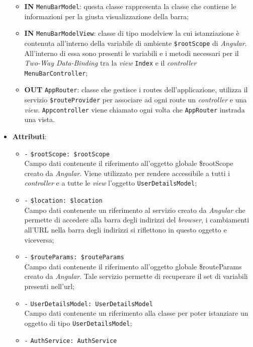 \begin{itemize}
\begin{itemize}
		\item \textbf{IN} \texttt{MenuBarModel}: questa classe rappresenta la classe che contiene le informazioni per la giusta visualizzazione della barra;
		\item \textbf{IN} \texttt{MenuBarModelView}: classe di tipo modelview la cui istanziazione è contenuta all'interno della variabile di ambiente \texttt{\$rootScope} di \textit{Angular}. All'interno di essa sono presenti le variabili e i metodi necessari per il \textit{Two-Way Data-Binding} tra la \textit{view} \texttt{Index} e il \textit{controller} \texttt{MenuBarController};
		\item \textbf{OUT} \texttt{AppRouter}: classe che gestisce i routes dell’applicazione, utilizza il servizio \texttt{\$routeProvider} per associare ad ogni route un \textit{controller} e una \textit{view}. \texttt{Appcontroller} viene chiamato ogni volta che \texttt{AppRouter} instrada una vista.
	\end{itemize}
	\item \textbf{Attributi}:
	\begin{itemize}
		\item \texttt{-} \texttt{\$rootScope: \$rootScope} \\
		Campo dati contenente il riferimento all'oggetto globale \$rootScope creato da \textit{Angular}. Viene utilizzato per rendere accessibile a tutti i \textit{controller} e a tutte le \textit{view} l'oggetto \texttt{UserDetailsModel};
		\item \texttt{-} \texttt{\$location: \$location} \\
		Campo dati contenente un riferimento al servizio creato da \textit{Angular} che permette di accedere alla barra degli indirizzi del \textit{browser}, i cambiamenti all'URL nella barra degli indirizzi si riflettono in questo oggetto e viceversa; 
		\item \texttt{-} \texttt{\$routeParams: \$routeParams} \\
		Campo dati contenente il riferimento all'oggetto globale \$routeParams creato da \textit{Angular}. Tale servizio permette di recuperare il set di variabili presenti nell'url;
		\item \texttt{-} \texttt{UserDetailsModel: UserDetailsModel} \\
		Campo dati contenente un riferimento alla classe per poter istanziare un oggetto di tipo \texttt{UserDetailsModel};
		\item \texttt{-} \texttt{AuthService: AuthService} \\

\end{itemize}
\end{itemize}
